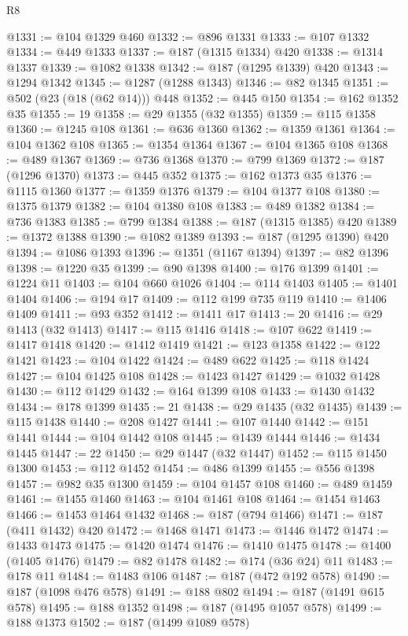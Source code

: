 \begin{lexlean}{R8}
\begin{coremodule}
@1331 := @104 @1329 @460
@1332 := @896 @1331
@1333 := @107 @1332
@1334 := @449 @1333
@1337 := @187 (@1315 @1334) @420
@1338 := @1314 @1337
@1339 := @1082 @1338
@1342 := @187 (@1295 @1339) @420
@1343 := @1294 @1342
@1345 := @1287 (@1288 @1343)
@1346 := @82 @1345
@1351 := @502 (@23 (@18 (@62 @14))) @448
@1352 := @445 @150
@1354 := @162 @1352 @35
@1355 := 19
@1358 := @29 @1355 (@32 @1355)
@1359 := @115 @1358
@1360 := @1245 @108
@1361 := @636 @1360
@1362 := @1359 @1361
@1364 := @104 @1362 @108
@1365 := @1354 @1364
@1367 := @104 @1365 @108
@1368 := @489 @1367
@1369 := @736 @1368
@1370 := @799 @1369
@1372 := @187 (@1296 @1370)
@1373 := @445 @352
@1375 := @162 @1373 @35
@1376 := @1115 @1360
@1377 := @1359 @1376
@1379 := @104 @1377 @108
@1380 := @1375 @1379
@1382 := @104 @1380 @108
@1383 := @489 @1382
@1384 := @736 @1383
@1385 := @799 @1384
@1388 := @187 (@1315 @1385) @420
@1389 := @1372 @1388
@1390 := @1082 @1389
@1393 := @187 (@1295 @1390) @420
@1394 := @1086 @1393
@1396 := @1351 (@1167 @1394)
@1397 := @82 @1396
@1398 := @1220 @35
@1399 := @90 @1398
@1400 := @176 @1399
@1401 := @1224 @11
@1403 := @104 @660 @1026
@1404 := @114 @1403
@1405 := @1401 @1404
@1406 := @194 @17
@1409 := @112 @199 @735 @119
@1410 := @1406 @1409
@1411 := @93 @352
@1412 := @1411 @17
@1413 := 20
@1416 := @29 @1413 (@32 @1413)
@1417 := @115 @1416
@1418 := @107 @622
@1419 := @1417 @1418
@1420 := @1412 @1419
@1421 := @123 @1358
@1422 := @122 @1421
@1423 := @104 @1422
@1424 := @489 @622
@1425 := @118 @1424
@1427 := @104 @1425 @108
@1428 := @1423 @1427
@1429 := @1032 @1428
@1430 := @112 @1429
@1432 := @164 @1399 @108
@1433 := @1430 @1432
@1434 := @178 @1399
@1435 := 21
@1438 := @29 @1435 (@32 @1435)
@1439 := @115 @1438
@1440 := @208 @1427
@1441 := @107 @1440
@1442 := @151 @1441
@1444 := @104 @1442 @108
@1445 := @1439 @1444
@1446 := @1434 @1445
@1447 := 22
@1450 := @29 @1447 (@32 @1447)
@1452 := @115 @1450 @1300
@1453 := @112 @1452
@1454 := @486 @1399
@1455 := @556 @1398
@1457 := @982 @35 @1300
@1459 := @104 @1457 @108
@1460 := @489 @1459
@1461 := @1455 @1460
@1463 := @104 @1461 @108
@1464 := @1454 @1463
@1466 := @1453 @1464 @1432
@1468 := @187 (@794 @1466)
@1471 := @187 (@411 @1432) @420
@1472 := @1468 @1471
@1473 := @1446 @1472
@1474 := @1433 @1473
@1475 := @1420 @1474
@1476 := @1410 @1475
@1478 := @1400 (@1405 @1476)
@1479 := @82 @1478
@1482 := @174 (@36 @24) @11
@1483 := @178 @11
@1484 := @1483 @106
@1487 := @187 (@472 @192 @578)
@1490 := @187 (@1098 @476 @578)
@1491 := @188 @802
@1494 := @187 (@1491 @615 @578)
@1495 := @188 @1352
@1498 := @187 (@1495 @1057 @578)
@1499 := @188 @1373
@1502 := @187 (@1499 @1089 @578)

\end{coremodule}
\end{lexlean}
